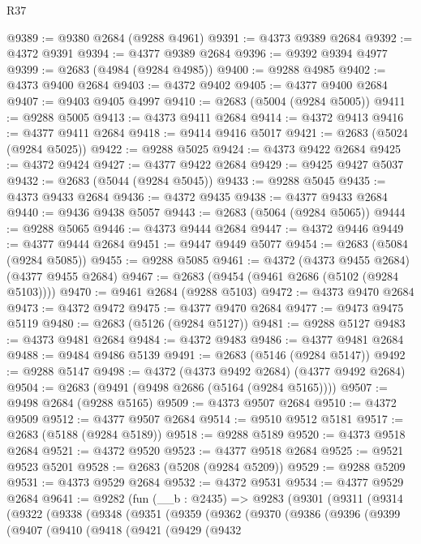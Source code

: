 \begin{lexlean}{R37}
\begin{coremodule}
@9389 := @9380 @2684 (@9288 @4961)
@9391 := @4373 @9389 @2684
@9392 := @4372 @9391
@9394 := @4377 @9389 @2684
@9396 := @9392 @9394 @4977
@9399 := @2683 (@4984 (@9284 @4985))
@9400 := @9288 @4985
@9402 := @4373 @9400 @2684
@9403 := @4372 @9402
@9405 := @4377 @9400 @2684
@9407 := @9403 @9405 @4997
@9410 := @2683 (@5004 (@9284 @5005))
@9411 := @9288 @5005
@9413 := @4373 @9411 @2684
@9414 := @4372 @9413
@9416 := @4377 @9411 @2684
@9418 := @9414 @9416 @5017
@9421 := @2683 (@5024 (@9284 @5025))
@9422 := @9288 @5025
@9424 := @4373 @9422 @2684
@9425 := @4372 @9424
@9427 := @4377 @9422 @2684
@9429 := @9425 @9427 @5037
@9432 := @2683 (@5044 (@9284 @5045))
@9433 := @9288 @5045
@9435 := @4373 @9433 @2684
@9436 := @4372 @9435
@9438 := @4377 @9433 @2684
@9440 := @9436 @9438 @5057
@9443 := @2683 (@5064 (@9284 @5065))
@9444 := @9288 @5065
@9446 := @4373 @9444 @2684
@9447 := @4372 @9446
@9449 := @4377 @9444 @2684
@9451 := @9447 @9449 @5077
@9454 := @2683 (@5084 (@9284 @5085))
@9455 := @9288 @5085
@9461 := @4372 (@4373 @9455 @2684) (@4377 @9455 @2684)
@9467 := @2683 (@9454 (@9461 @2686 (@5102 (@9284 @5103))))
@9470 := @9461 @2684 (@9288 @5103)
@9472 := @4373 @9470 @2684
@9473 := @4372 @9472
@9475 := @4377 @9470 @2684
@9477 := @9473 @9475 @5119
@9480 := @2683 (@5126 (@9284 @5127))
@9481 := @9288 @5127
@9483 := @4373 @9481 @2684
@9484 := @4372 @9483
@9486 := @4377 @9481 @2684
@9488 := @9484 @9486 @5139
@9491 := @2683 (@5146 (@9284 @5147))
@9492 := @9288 @5147
@9498 := @4372 (@4373 @9492 @2684) (@4377 @9492 @2684)
@9504 := @2683 (@9491 (@9498 @2686 (@5164 (@9284 @5165))))
@9507 := @9498 @2684 (@9288 @5165)
@9509 := @4373 @9507 @2684
@9510 := @4372 @9509
@9512 := @4377 @9507 @2684
@9514 := @9510 @9512 @5181
@9517 := @2683 (@5188 (@9284 @5189))
@9518 := @9288 @5189
@9520 := @4373 @9518 @2684
@9521 := @4372 @9520
@9523 := @4377 @9518 @2684
@9525 := @9521 @9523 @5201
@9528 := @2683 (@5208 (@9284 @5209))
@9529 := @9288 @5209
@9531 := @4373 @9529 @2684
@9532 := @4372 @9531
@9534 := @4377 @9529 @2684
@9641 := @9282
    (fun (__b : @2435) =>
    @9283
      (@9301
        (@9311
          (@9314
            (@9322
              (@9338
                (@9348
                  (@9351
                    (@9359
                      (@9362
                        (@9370
                          (@9386
                            (@9396
                              (@9399
                                (@9407
                                  (@9410
                                    (@9418
                                      (@9421
                                        (@9429
                                          (@9432

\end{coremodule}
\end{lexlean}
